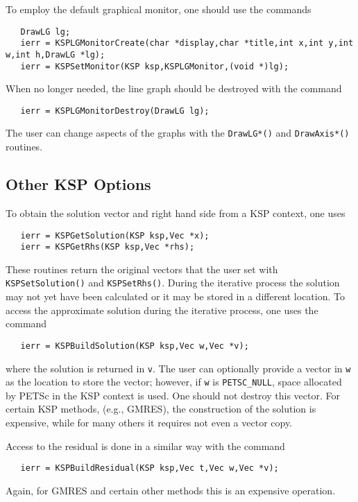 To employ the default graphical monitor, one should use the 
commands  
\begin{verbatim}
   DrawLG lg;
   ierr = KSPLGMonitorCreate(char *display,char *title,int x,int y,int w,int h,DrawLG *lg);
   ierr = KSPSetMonitor(KSP ksp,KSPLGMonitor,(void *)lg);
\end{verbatim}
When no longer needed, the line graph should be destroyed 
with the command
\begin{verbatim}
   ierr = KSPLGMonitorDestroy(DrawLG lg);
\end{verbatim}
The user can change aspects of the graphs with the {\tt DrawLG*()} and 
{\tt DrawAxis*()} routines.  


\subsection{Other KSP Options}

To obtain the solution vector and right hand side from a KSP 
context, one uses  
\begin{verbatim}
   ierr = KSPGetSolution(KSP ksp,Vec *x);
   ierr = KSPGetRhs(KSP ksp,Vec *rhs);
\end{verbatim}
These routines return the original vectors that the user set with 
{\tt KSPSetSolution()} and {\tt KSPSetRhs()}. 
During  the iterative process
the solution may not yet have been calculated or it may be stored in 
a different location. To access the approximate solution during the 
iterative process, one uses the command 
\begin{verbatim}
   ierr = KSPBuildSolution(KSP ksp,Vec w,Vec *v);
\end{verbatim}
where the solution is returned in {\tt v}. The user can optionally provide
a vector in {\tt w} as the location to store the vector; however, if 
{\tt w} is {\tt PETSC\_NULL}, space allocated by PETSc in the KSP context is 
used. One should not destroy this vector. For certain KSP methods, 
(e.g., GMRES), the construction of the solution is expensive, while for many 
others it requires not even a vector copy. 

Access to the residual is done in a similar way with the 
command 
\begin{verbatim}
   ierr = KSPBuildResidual(KSP ksp,Vec t,Vec w,Vec *v);
\end{verbatim}
Again, for GMRES and certain other methods this is an expensive 
operation.

